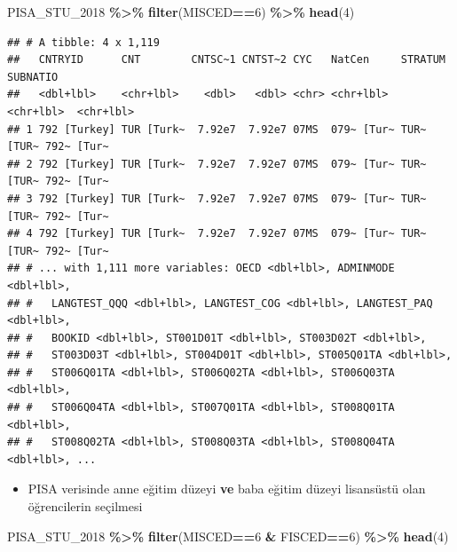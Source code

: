 \documentclass[
  oneside]{book}
\newenvironment{Shaded}{\begin{snugshade}}{\end{snugshade}}
\newcommand{\DecValTok}[1]{\textcolor[rgb]{0.00,0.00,0.81}{#1}}
\newcommand{\FunctionTok}[1]{\textcolor[rgb]{0.13,0.29,0.53}{\textbf{#1}}}
\newcommand{\NormalTok}[1]{#1}
\newcommand{\SpecialCharTok}[1]{\textcolor[rgb]{0.81,0.36,0.00}{\textbf{#1}}}
\providecommand{\tightlist}{%
  \setlength{\itemsep}{0pt}\setlength{\parskip}{0pt}}
\begin{document}
\begin{Shaded}
\begin{Highlighting}[]
\NormalTok{PISA\_STU\_2018 }\SpecialCharTok{\%\textgreater{}\%} \FunctionTok{filter}\NormalTok{(MISCED}\SpecialCharTok{==}\DecValTok{6}\NormalTok{) }\SpecialCharTok{\%\textgreater{}\%} \FunctionTok{head}\NormalTok{(}\DecValTok{4}\NormalTok{)}
\end{Highlighting}
\end{Shaded}

\begin{verbatim}
## # A tibble: 4 x 1,119
##   CNTRYID      CNT        CNTSC~1 CNTST~2 CYC   NatCen     STRATUM    SUBNATIO  
##   <dbl+lbl>    <chr+lbl>    <dbl>   <dbl> <chr> <chr+lbl>  <chr+lbl>  <chr+lbl> 
## 1 792 [Turkey] TUR [Turk~  7.92e7  7.92e7 07MS  079~ [Tur~ TUR~ [TUR~ 792~ [Tur~
## 2 792 [Turkey] TUR [Turk~  7.92e7  7.92e7 07MS  079~ [Tur~ TUR~ [TUR~ 792~ [Tur~
## 3 792 [Turkey] TUR [Turk~  7.92e7  7.92e7 07MS  079~ [Tur~ TUR~ [TUR~ 792~ [Tur~
## 4 792 [Turkey] TUR [Turk~  7.92e7  7.92e7 07MS  079~ [Tur~ TUR~ [TUR~ 792~ [Tur~
## # ... with 1,111 more variables: OECD <dbl+lbl>, ADMINMODE <dbl+lbl>,
## #   LANGTEST_QQQ <dbl+lbl>, LANGTEST_COG <dbl+lbl>, LANGTEST_PAQ <dbl+lbl>,
## #   BOOKID <dbl+lbl>, ST001D01T <dbl+lbl>, ST003D02T <dbl+lbl>,
## #   ST003D03T <dbl+lbl>, ST004D01T <dbl+lbl>, ST005Q01TA <dbl+lbl>,
## #   ST006Q01TA <dbl+lbl>, ST006Q02TA <dbl+lbl>, ST006Q03TA <dbl+lbl>,
## #   ST006Q04TA <dbl+lbl>, ST007Q01TA <dbl+lbl>, ST008Q01TA <dbl+lbl>,
## #   ST008Q02TA <dbl+lbl>, ST008Q03TA <dbl+lbl>, ST008Q04TA <dbl+lbl>, ...
\end{verbatim}

\begin{itemize}
\tightlist
\item
  PISA verisinde anne eğitim düzeyi \textbf{ve} baba eğitim düzeyi lisansüstü olan öğrencilerin seçilmesi
\end{itemize}

\begin{Shaded}
\begin{Highlighting}[]
\NormalTok{PISA\_STU\_2018 }\SpecialCharTok{\%\textgreater{}\%} \FunctionTok{filter}\NormalTok{(MISCED}\SpecialCharTok{==}\DecValTok{6} \SpecialCharTok{\&}\NormalTok{ FISCED}\SpecialCharTok{==}\DecValTok{6}\NormalTok{)  }\SpecialCharTok{\%\textgreater{}\%} \FunctionTok{head}\NormalTok{(}\DecValTok{4}\NormalTok{)}
\end{Highlighting}
\end{Shaded}
\end{document}

